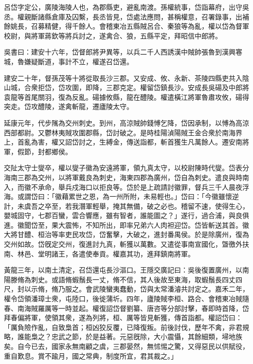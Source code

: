 
\begin{pinyinscope}
呂岱字定公，廣陵海陵人也，為郡縣吏，避亂南渡。孫權統事，岱詣幕府，出守吳丞。權親斷諸縣倉庫及囚繫，長丞皆見，岱處法應問，甚稱權意，召署錄事，出補餘姚長，召募精健，得千餘人。會稽東冶五縣賊呂合、秦狼等為亂，權以岱為督軍校尉，與將軍蔣欽等將兵討之，遂禽合、狼，五縣平定，拜昭信中郎將。

吳書曰：建安十六年，岱督郎將尹異等，以兵二千人西誘漢中賊帥張魯到漢興寋城，魯嫌疑斷道，事計不立，權遂召岱還。

建安二十年，督孫茂等十將從取長沙三郡。又安成、攸、永新、茶陵四縣吏共入陰山城，合衆拒岱，岱攻圍，即降，三郡克定。權留岱鎮長沙。安成長吳碭及中郎將袁龍等首尾關羽，復為反亂。碭據攸縣，龍在醴陵。權遣橫江將軍魯肅攻攸，碭得突走。岱攻醴陵，遂禽斬龍，遷廬陵太守。

延康元年，代步隲為交州刺史。到州，高涼賊帥錢愽乞降，岱因承制，以愽為高涼西部都尉。又鬱林夷賊攻圍郡縣，岱討破之。是時桂陽湞陽賊王金合衆於南海界上，首亂為害，權又詔岱討之，生縛金，傳送詣都，斬首獲生凡萬餘人。遷安南將軍，假節，封都鄉侯。

交阯太守士燮卒，權以燮子徽為安遠將軍，領九真太守，以校尉陳時代燮。岱表分海南三郡為交州，以將軍戴良為刺史，海東四郡為廣州，岱自為刺史。遣良與時南入，而徽不承命，舉兵戍海口以拒良等。岱於是上疏請討徽罪，督兵三千人晨夜浮海。或謂岱曰：「徽藉累世之恩，為一州所附，未易輕也。」岱曰：「今徽雖懷逆計，未虞吾之卒至，若我潛軍輕舉，掩其無備，破之必也。稽留不速，使得生心，嬰城固守，七郡百蠻，雲合響應，雖有智者，誰能圖之？」遂行，過合浦，與良俱進。徽聞岱至，果大震怖，不知所出，即率兄弟六人肉袒迎岱。岱皆斬送其首。徽大將甘醴、桓治等率吏民攻岱，岱奮擊，大破之，進封番禺侯。於是除廣州，復為交州如故。岱旣定交州，復進討九真，斬獲以萬數。又遣從事南宣國化，曁徼外扶南、林邑、堂明諸王，各遣使奉貢。權嘉其功，進拜鎮南將軍。

黃龍三年，以南土清定，召岱還屯長沙漚口。王隱交廣記曰：吳後復置廣州，以南陽滕脩為刺史。或語脩蝦鬚長一丈，脩不信，其人後故至東海，取蝦鬚長四丈四尺，封以示脩，脩乃服之。會武陵蠻夷蠢動，岱與太常潘濬共討定之。嘉禾二年，權令岱領潘璋士衆，屯陸口，後徙蒲圻。四年，廬陵賊李桓、路合、會稽東冶賊隨春、南海賊羅厲等一時並起。權復詔岱督劉纂、唐咨等分部討擊，春即時首降，岱拜春偏將軍，使領其衆，遂為列將，桓、厲等皆見斬獲，傳首詣都。權詔岱曰：「厲負險作亂，自致梟首；桓凶狡反覆，已降復叛。前後討伐，歷年不禽，非君規略，誰能梟之？忠武之節，於是益著。元惡旣除，大小震懾，其餘細類，埽地族矣。自今已去，國家永無南顧之虞，三郡晏然，無怵惕之驚，又得惡民以供賦役，重自歎息。賞不踰月，國之常典，制度所宜，君其裁之。」


\end{pinyinscope}
